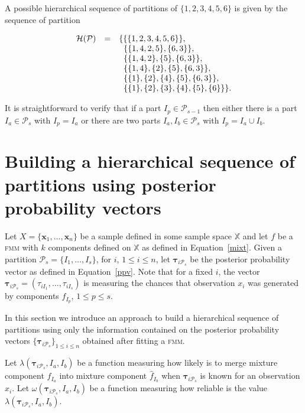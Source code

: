 \documentclass[10pt, a4paper]{article}
\newcommand{\m}[1]{\boldsymbol{#1}}
\newcommand{\fmm}{\textsc{fmm}\xspace}
\begin{document}
\begin{spacing}{1.9}
A possible hierarchical sequence of partitions of $\{1, 2, 3, 4, 5, 6\}$ is given by the sequence of partition

\begin{equation}
\begin{array}{r c l}
\mathcal{H}(\mathcal{P}) &=& \{ \{\{1, 2, 3, 4, 5, 6\}\}, \\
   & & \;\; \{ \{1, 4, 2, 5\}, \{6, 3\} \},  \\
    & & \;\; \{ \{1, 4, 2\}, \{5\}, \{6, 3\} \}, \\
   & & \;\; \{ \{1, 4\},\{2\}, \{5\}, \{6, 3\} \}, \\
   & & \;\;  \{\{1\},\{2\},\{4\},\{5\},\{6,3\} \},\\
   & &  \;\;  \{\{1\},\{2\},\{3\},\{4\},\{5\},\{6\}\} \}.
\end{array}
\label{hier_ex}
\end{equation}

It is straightforward to verify that if a part $I_p \in \mathcal{P}_{s-1}$ then either there is a part $I_a \in \mathcal{P}_{s}$ with $I_p = I_a$ or there are two parts $I_a, I_b \in \mathcal{P}_s$ with $I_p = I_a \cup I_b$.


\section{Building a hierarchical sequence of partitions using posterior probability vectors}

Let $X = \{\m x_1,\dots,\m x_n \}$ be a sample defined in some sample space $\mathbb{X}$ and let $f$ be a \fmm with $k$ components defined on $\mathbb{X}$ as defined in Equation~\ref{mixt}. Given a partition $\mathcal{P}_s = \{I_1, \dots, I_s\}$, for $i$, $1\leq i \leq n $, let $\m\tau_{i \mathcal{P}_s}$ be the posterior probability vector as defined in Equation~\ref{ppv}. Note that for a fixed $i$, the vector $\m\tau_{i \mathcal{P}_s} =  \left( \tau_{i I_1} , \dots, \tau_{i I_s}  \right)$ is measuring the chances that observation $x_i$ was generated by components $f_{I_p}$, $1 \leq p \leq s$.

In this section we introduce an approach to build a hierarchical sequence of partitions using only the information contained on the posterior probability vectors $\{\m\tau_{i \mathcal{P}_s}\}_{1\leq i \leq n}$ obtained after fitting a \fmm.


Let $\lambda(\m\tau_{i \mathcal{P}_s},  I_a,  I_b)$ be a function measuring how likely is to merge mixture component $\hat{f}_{I_a}$ into mixture component $\hat{f}_{I_b}$ when $\m \tau_{i \mathcal{P}_s}$ is known for an observation $x_i$. Let $\omega(\m\tau_{i \mathcal{P}_s},  I_a,  I_b)$ be a function measuring how reliable is the value $\lambda(\m\tau_{i \mathcal{P}_s},  I_a,  I_b)$.



\end{spacing}
\end{document}
